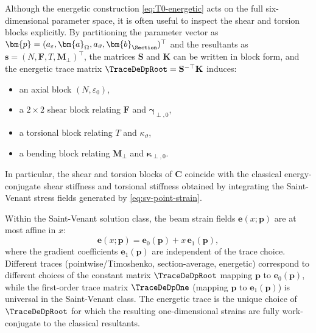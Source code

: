 \begin{remark}
Although the energetic construction \eqref{eq:T0-energetic} acts on the full
six-dimensional parameter space, it is often useful to inspect the shear and
torsion blocks explicitly. By partitioning the parameter vector as
$\bm{p}=(a_\varepsilon,\bm{a}_\Omega,a_\vartheta,\bm{b}_{\Section})^\top$ and the
resultants as $\bm{s}=(N,\bm{F},T,\bm{M}_\perp)^\top$, the matrices
$\mathbf{S}$ and $\mathbf{K}$ can be written in block form, and the energetic
trace matrix $\TraceDeDpRoot = \mathbf{S}^{-\top}\mathbf{K}$ induces:
\begin{itemize}
\item an axial block $(N,\varepsilon_0)$,
\item a $2\times 2$ shear block relating $\bm{F}$ and $\bm{\gamma}_{\perp,0}$,
\item a torsional block relating $T$ and $\kappa_\vartheta$,
\item a bending block relating $\bm{M}_\perp$ and $\bm{\kappa}_{\perp,0}$.
\end{itemize}
In particular, the shear and torsion blocks of $\mathbf{C}$ coincide with the
classical energy-conjugate shear stiffness and torsional stiffness obtained by
integrating the Saint-Venant stress fields generated by
\eqref{eq:sv-point-strain}.
\end{remark}

\begin{remark}
Within the Saint-Venant solution class, the beam strain fields
$\bm{e}(x;\bm{p})$ are at most affine in $x$:
\[
\bm{e}(x;\bm{p}) = \bm{e}_0(\bm{p}) + x\,\bm{e}_1(\bm{p}),
\]
where the gradient coefficients $\bm{e}_1(\bm{p})$ are independent of the
trace choice. 
Different traces (pointwise/Timoshenko, section-average, energetic)
correspond to different choices of the constant matrix $\TraceDeDpRoot$ mapping
$\bm{p}$ to $\bm{e}_0(\bm{p})$, while the first-order trace matrix
$\TraceDeDpOne$ (mapping $\bm{p}$ to $\bm{e}_1(\bm{p})$) is universal in the
Saint-Venant class. 
The energetic trace is the unique choice of $\TraceDeDpRoot$
for which the resulting one-dimensional strains are fully work-conjugate to the
classical resultants.
\end{remark}



